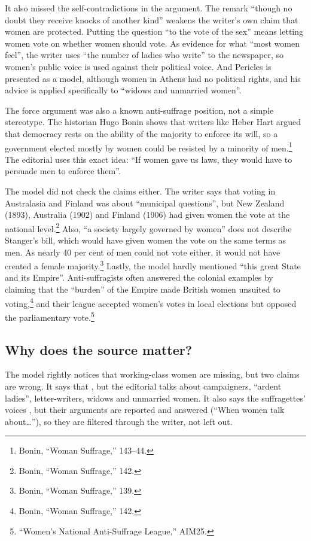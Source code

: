 It also missed the self-contradictions in the argument.
The remark \enquote{though no doubt they receive knocks of another kind} weakens the writer's own claim that women are protected.
Putting the question \enquote{to the vote of the sex} means letting women vote on whether women should vote.
As evidence for what \enquote{most women feel}, the writer uses \enquote{the number of ladies who write} to the newspaper, so women's public voice is used against their political voice.
And Pericles is presented as a model, although women in Athens had no political rights, and his advice is applied specifically to \enquote{widows and unmarried women}.

The force argument was also a known anti-suffrage position, not a simple stereotype.
The historian Hugo Bonin shows that writers like Heber Hart argued that democracy rests on the ability of the majority to enforce its will, so a government elected mostly by women could be resisted by a minority of men.\footnote{Bonin, \enquote{Woman Suffrage,} 143--44.}
The editorial uses this exact idea: \enquote{If women gave us laws, they would have to persuade men to enforce them}.

The model did not check the claims either. The writer says that voting in Australasia and Finland was about \enquote{municipal questions}, but New Zealand (1893), Australia (1902) and Finland (1906) had given women the vote at the national level.\footnote{Bonin, \enquote{Woman Suffrage,} 142.}
Also, \enquote{a society largely governed by women} does not describe Stanger's bill, which would have given women the vote on the same terms as men.
As nearly 40 per cent of men could not vote either, it would not have created a female majority.\footnote{Bonin, \enquote{Woman Suffrage,} 139.}
Lastly, the model hardly mentioned \enquote{this great State and its Empire}.
Anti-suffragists often answered the colonial examples by claiming that the \enquote{burden} of the Empire made British women unsuited to voting,\footnote{Bonin, \enquote{Woman Suffrage,} 142.}
and their league accepted women's votes in local elections but opposed the parliamentary vote.\footnote{\enquote{Women's National Anti-Suffrage League,} AIM25.}

\subsection{Why does the source matter?}

The model rightly notices that working-class women are missing, but two claims are wrong.
It says that , but the editorial talks about campaigners, \enquote{ardent ladies}, letter-writers, widows and unmarried women.
It also says the suffragettes' voices , but their arguments are reported and answered (\enquote{When women talk about\ldots}), so they are filtered through the writer, not left out.

